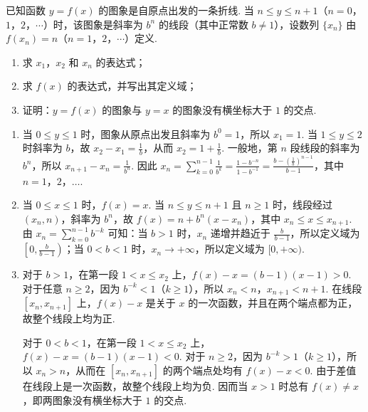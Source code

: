 \documentclass[UTF8,a4paper,oneside,11pt]{ctexbook}
\begin{document}
\begin{problem}
已知函数 \(y=f(x)\) 的图象是自原点出发的一条折线. 当 \(n\leqslant y\leqslant n+1\)（\(n=0\)，\(1\)，\(2\)，\(\cdots\)）时，该图象是斜率为 \(b^n\) 的线段（其中正常数 \(b\neq 1\)），设数列 \(\{x_n\}\) 由 \(f(x_n)=n\)（\(n=1\)，\(2\)，\(\cdots\)）定义.

\begin{enumerate}
\item 求 \(x_1\)，\(x_2\) 和 \(x_n\) 的表达式；
\item 求 \(f(x)\) 的表达式，并写出其定义域；
\item 证明：\(y=f(x)\) 的图象与 \(y=x\) 的图象没有横坐标大于 \(1\) 的交点.
\end{enumerate}
\end{problem}

\begin{solution}
\begin{enumerate}
\item 当 \(0\leqslant y\leqslant1\) 时，图象从原点出发且斜率为 \(b^0=1\)，所以 \(x_1=1\). 当 \(1\leqslant y\leqslant2\) 时斜率为 \(b\)，故 \(x_2-x_1=\frac{1}{b}\)，从而 \(x_2=1+\frac{1}{b}\). 一般地，第 \(n\) 段线段的斜率为 \(b^n\)，所以 \(x_{n+1}-x_n=\frac{1}{b^n}\). 因此
\(x_n=\sum_{k=0}^{n-1}\frac{1}{b^k}=\frac{1-b^{-n}}{1-b^{-1}}=\frac{b-(\frac{1}{b})^{n-1}}{b-1}\)，其中 \(n=1\)，\(2\)，\(\ldots\).
\item 当 \(0\leqslant x\leqslant1\) 时，\(f(x)=x\). 当 \(n\leqslant y\leqslant n+1\) 且 \(n\geqslant1\) 时，线段经过 \((x_n,n)\)，斜率为 \(b^n\)，故 \(f(x)=n+b^n(x-x_n)\)，其中 \(x_n\leqslant x\leqslant x_{n+1}\). 由 \(x_n=\sum_{k=0}^{n-1}b^{-k}\) 可知：当 \(b>1\) 时，\(x_n\) 递增并趋近于 \(\frac{b}{b-1}\)，所以定义域为 \(\left[0,\frac{b}{b-1}\right)\)；当 \(0<b<1\) 时，\(x_n\to+\infty\)，所以定义域为 \([0,+\infty)\).
\item 对于 \(b>1\)，在第一段 \(1<x\leqslant x_2\) 上，\(f(x)-x=(b-1)(x-1)>0\). 对于任意 \(n\geqslant2\)，因为 \(b^{-k}<1\)（\(k\geqslant1\)），所以 \(x_n<n\)，\(x_{n+1}<n+1\). 在线段 \([x_n,x_{n+1}]\) 上，\(f(x)-x\) 是关于 \(x\) 的一次函数，并且在两个端点都为正，故整个线段上均为正.

对于 \(0<b<1\)，在第一段 \(1<x\leqslant x_2\) 上，\(f(x)-x=(b-1)(x-1)<0\). 对于 \(n\geqslant2\)，因为 \(b^{-k}>1\)（\(k\geqslant1\)），所以 \(x_n>n\)，从而在 \([x_n,x_{n+1}]\) 的两个端点处均有 \(f(x)-x<0\). 由于差值在线段上是一次函数，故整个线段上均为负. 因而当 \(x>1\) 时总有 \(f(x)\neq x\)，即两图象没有横坐标大于 \(1\) 的交点.
\end{enumerate}
\end{solution}
\end{document}
